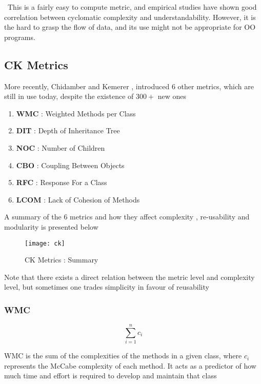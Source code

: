 \par{~This is a fairly easy to compute metric, and
empirical studies have shown good correlation between cyclomatic complexity and
understandability. However, it is the hard to grasp the flow of data, and its
use might not be appropriate for OO programs.}

\subsection{CK Metrics}

\par{More recently, Chidamber and Kemerer \cite{chidamber_kemerer94}, introduced
6 other metrics, which are still in use today, despite the existence of $300+$
new ones}

\begin{enumerate}
	\item\textbf{WMC} : Weighted Methods per Class
	\item\textbf{DIT} : Depth of Inheritance Tree
	\item\textbf{NOC} : Number of Children
	\item\textbf{CBO} : Coupling Between Objects
	\item\textbf{RFC} : Response For a Class
	\item\textbf{LCOM} : Lack of Cohesion of Methods
\end{enumerate}

\par{A summary of the 6 metrics and how they affect complexity , re-usability
and modularity is presented below}

\begin{figure}[H]
	\texttt{[image: ck]}
	\caption{CK Metrics : Summary}
\end{figure}

\par{Note that there exists a direct relation between the
metric level and complexity level, but sometimes one trades simplicity in favour
of reusability} 

\subsubsection{WMC}

$$\sum_{i=1}^{n}c_i$$

\par{WMC is the sum of the complexities of the methods in a given class, where
$c_i$ represents the McCabe complexity of each method. It acts as a predictor of
how much time and effort is required to develop and maintain that class}

